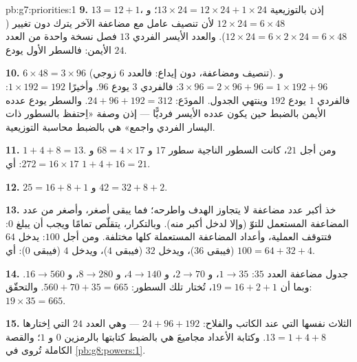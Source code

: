 \begin{solution}{pb:g7:priorities:1}
\textbf{9.} $13 = 12 + 1$، إذن بالتوزيعية
$13 \times 24 = 12 \times 24 + 1 \times 24$؛ و
$12 \times 24 = 6 \times 48$ لأن تنصيف عامل مع
مضاعفة الآخر يترك  دون تغيير
($12 \times 24 = 6 \times 2 \times 24 = 6 \times 48$). والعدد
الأيسر الفردي $13$ فصل نسخة واحدة من العدد الأيمن: فالسطر
الأول يودع $24$.

\textbf{10.} $6 \times 48 = 3 \times 96$ (تنصيف ومضاعفة، دون
إيداع: فالعدد $6$ زوجي). و $3 \times 96 = 2 \times 96 + 96 =
1 \times 192 + 96$: فالفردي $3$ يودع $96$. وأخيرًا
$1 \times 192 = 192$: فالفردي $1$ يودع $192$ وينتهي الجدول.
 المودَع: $24 + 96 + 192 = 312$. والسطر يودع عدده
الأيمن بالضبط حين يكون عدده الأيسر فرديًّا --- إذن
وصفة «اِحتفظ بالسطور ذات اليسار الفردي واجمع» هي بالضبط
محاسبة التوزيعية.

\textbf{11.} $1 + 4 + 8 = 13$. ومن أجل $21$، كانت السطور الناجية
سطور $17$ و $68 = 4 \times 17$ و $272 = 16 \times 17$: أي
 $1 + 4 + 16 = 21$.

\textbf{12.} $25 = 16 + 8 + 1$ و $42 = 32 + 8 + 2$.

\textbf{13.} خذ أكبر عدد مضاعفة لا يتجاوز
الهدف واطرحه؛ فما يبقى أصغر، وأصغر
من عدد المضاعفة المستعمل للتوّ (وإلا لدخل أكبر
منه). وبالتكرار، يتقلّص  تمامًا
ويجب أن يبلغ $0$: فتتوقف العملية، وأعداد المضاعفة المستعملة
كلها مختلفة. ومن أجل $100$: يدخل $64$ (فيبقى $36$)، ويدخل $32$
(فيبقى $4$)، ويدخل $4$ (فيبقى $0$): أي $100 = 64 + 32 + 4$.

\textbf{14.} جدول مضاعفة العدد $35$: $1 \to 35$، و $2 \to 70$،
و $4 \to 140$، و $8 \to 280$، و $16 \to 560$. وبما أن
$19 = 16 + 2 + 1$، تُختار تلك السطور:
$560 + 70 + 35 = 665$. والتحقّق: $19 \times 35 = 665$.

\textbf{15.} الثلاث نفسها التي عند الكاتب والفلاح:
$24 + 96 + 192$ --- وهي  العدد $24$ التي اِختارها
$13 = 1 + 4 + 8$. وكتابة الأعداد مجاميعَ  هي
بالضبط كتابتها بالرمزين $0$ و $1$؛ والقصة الكاملة تُروى
في \cref{pb:g8:powers:1}.
\end{solution}
